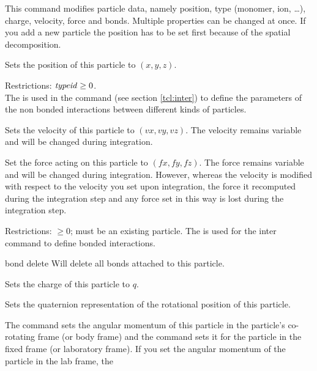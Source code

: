 This command modifies particle data, namely position, type (monomer,
ion, \dots), charge, velocity, force and bonds. Multiple properties can
be changed at once. If you add a new particle the position has to be
set first because of the spatial decomposition.

\begin{arguments}
\item[\var{pid}]
\item[\opt{pos \var{x} \var{y} \var{z}}] Sets the position of this
  particle to $(x,y,z)$.
\item[\opt{type \var{typeid}}] Restrictions:
  $\mathrm{\mathit{typeid}} \geq 0$.\\ The
   is used in the  command
  (see section \vref{tcl:inter}) to define the parameters of the non
  bonded interactions between different kinds of particles.
\item[\opt{v \var{vx} \var{vy} \var{vz}}] Sets the velocity of
  this particle to $(vx,vy,vz)$. The velocity remains variable and will be changed
  during integration.
\item[\opt{f \var{fx} \var{fy} \var{fz}}] Set the force acting on this particle
  to $(fx,fy,fz)$. The force remains variable and will be changed during integration. 
  However, whereas the velocity is modified with respect to the velocity you set
  upon integration, the force it recomputed during the integration step and any 
  force set in this way is lost during the integration step.
\item[\opt{bond \var{bondid} \var{pid2}\dots}]
  Restrictions:  $\geq 0$;  must
  be an existing particle.  The  is used for
  the inter command to define bonded interactions.
\item[bond delete] Will delete all bonds attached to this particle.
\item[\opt{q \var{charge}}] Sets the charge of this particle to $q$.
\item[\opt{quat \var{q1} \var{q2} \var{q3} \var{q4}}] Sets the
  quaternion representation of the rotational position of this
  particle.
\item[\opt{omega_body} \var{x} \var{y} \var{z} \alt \opt{omega_body}
  \var{x} \var{y} \var{z}] The command  sets the
  angular momentum of this particle in the particle's co-rotating
  frame (or body frame) and the command  sets it for
  the particle in the fixed frame (or laboratory frame). If you set
  the angular momentum of the particle in the lab frame, the

\end{arguments}
